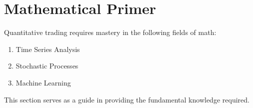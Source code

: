 \section{Mathematical Primer}

Quantitative trading requires mastery in the following fields of math:
\begin{enumerate}[label=\roman*.]
\setlength{\itemsep}{0pt}
\item Time Series Analysis
\item Stochastic Processes
\item Machine Learning
\end{enumerate}

This section serves as a guide in providing the fundamental knowledge required.



\newpage


